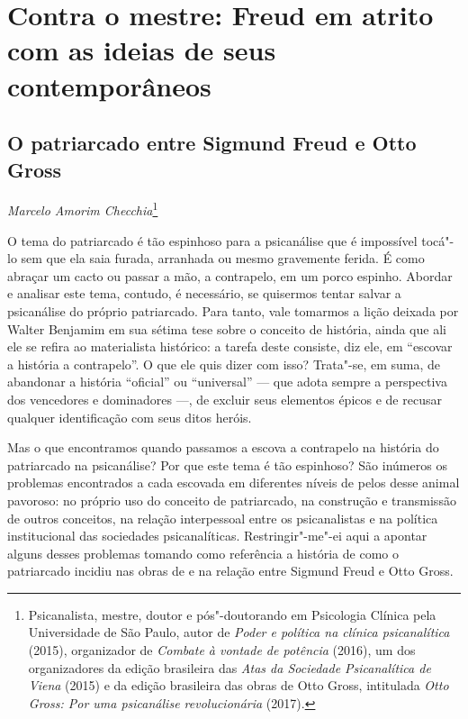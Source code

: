 \part{Contra o mestre: Freud em atrito com as ideias de seus contemporâneos}


\chapter*{O patriarcado entre Sigmund Freud e Otto Gross}


\begin{flushright}
\emph{Marcelo Amorim Checchia}\footnote{Psicanalista, mestre, doutor e
  pós"-doutorando em Psicologia Clínica pela Universidade de São Paulo,
  autor de \emph{Poder e política na clínica psicanalítica} (2015),
  organizador de \emph{Combate à vontade de potência} (2016), um dos
  organizadores da edição brasileira das \emph{Atas da Sociedade
  Psicanalítica de Viena} (2015) e da edição brasileira das obras de
  Otto Gross, intitulada \emph{Otto Gross: Por uma psicanálise
  revolucionária} (2017).}
\end{flushright}

O tema do patriarcado é tão espinhoso para a psicanálise que é
impossível tocá"-lo sem que ela saia furada, arranhada ou mesmo
gravemente ferida. É como abraçar um cacto ou passar a mão, a
contrapelo, em um porco espinho. Abordar e analisar este tema, contudo,
é necessário, se quisermos tentar salvar a psicanálise do próprio
patriarcado. Para tanto, vale tomarmos a lição deixada por Walter
Benjamim em sua sétima tese sobre o conceito de história, ainda que ali
ele se refira ao materialista histórico: a tarefa deste consiste, diz
ele, em ``escovar a história a contrapelo''. O que ele quis dizer com
isso? Trata"-se, em suma, de abandonar a história ``oficial'' ou
``universal'' --- que adota sempre a perspectiva dos vencedores e
dominadores ---, de excluir seus elementos épicos e de recusar qualquer
identificação com seus ditos heróis.

Mas o que encontramos quando passamos a escova a contrapelo na história
do patriarcado na psicanálise? Por que este tema é tão espinhoso? São
inúmeros os problemas encontrados a cada escovada em diferentes níveis
de pelos desse animal pavoroso: no próprio uso do conceito de
patriarcado, na construção e transmissão de outros conceitos, na relação
interpessoal entre os psicanalistas e na política institucional das
sociedades psicanalíticas. Restringir"-me"-ei aqui a apontar alguns desses
problemas tomando como referência a história de como o patriarcado
incidiu nas obras de e na relação entre Sigmund Freud e Otto Gross.

